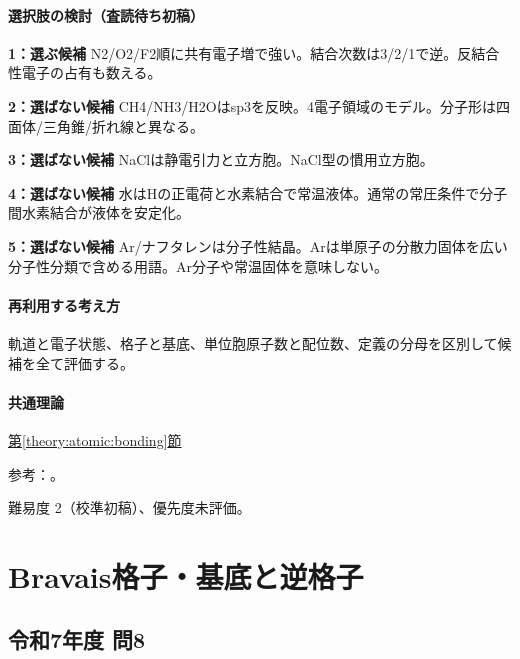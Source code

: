 \paragraph{選択肢の検討（査読待ち初稿）}\mbox{}\par

\noindent\textbf{1：選ぶ候補} N2/O2/F2順に共有電子増で強い。結合次数は3/2/1で逆。反結合性電子の占有も数える。\par

\noindent\textbf{2：選ばない候補} CH4/NH3/H2Oはsp3を反映。4電子領域のモデル。分子形は四面体/三角錐/折れ線と異なる。\par

\noindent\textbf{3：選ばない候補} NaClは静電引力と立方胞。NaCl型の慣用立方胞。\par

\noindent\textbf{4：選ばない候補} 水はHの正電荷と水素結合で常温液体。通常の常圧条件で分子間水素結合が液体を安定化。\par

\noindent\textbf{5：選ばない候補} Ar/ナフタレンは分子性結晶。Arは単原子の分散力固体を広い分子性分類で含める用語。Ar分子や常温固体を意味しない。\par

\paragraph{再利用する考え方} 軌道と電子状態、格子と基底、単位胞原子数と配位数、定義の分母を区別して候補を全て評価する。

\paragraph{共通理論} \hyperref[theory:atomic:bonding]{第\ref*{theory:atomic:bonding}節}

\par 参考：\cite{atomic_nonbond}。

\par 難易度 2（校準初稿）、優先度未評価。

\section{Bravais格子・基底と逆格子}

\subsection{令和7年度 問8}
\label{q:r07-reg-applied-08}

